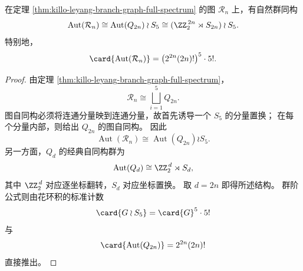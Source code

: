 \begin{proposition}\label{prop:killo-leyang-branch-graph-automorphism-wreath}
在定理 \ref{thm:killo-leyang-branch-graph-full-spectrum} 的图 \(\mathcal R_n\) 上，有自然群同构
\[
\operatorname{Aut}(\mathcal R_n)
\cong
\operatorname{Aut}(Q_{2n})\wr S_5
\cong
(\ZZ_2^{\,2n}\rtimes S_{2n})\wr S_5.
\]
特别地，
\[
\card{\operatorname{Aut}(\mathcal R_n)}
=
\bigl(2^{2n}(2n)!\bigr)^5\cdot 5!.
\]
\end{proposition}
\begin{proof}
由定理 \ref{thm:killo-leyang-branch-graph-full-spectrum}，
\[
\mathcal R_n\cong \bigsqcup_{i=1}^{5}Q_{2n}.
\]
图自同构必须将连通分量映到连通分量，故首先诱导一个 \(S_5\) 的分量置换；
在每个分量内部，则给出 \(Q_{2n}\) 的图自同构。
因此
\[
\operatorname{Aut}(\mathcal R_n)\cong \operatorname{Aut}(Q_{2n})\wr S_5.
\]
另一方面，\(Q_d\) 的经典自同构群为
\[
\operatorname{Aut}(Q_d)\cong \ZZ_2^{\,d}\rtimes S_d,
\]
其中 \(\ZZ_2^{\,d}\) 对应逐坐标翻转，\(S_d\) 对应坐标置换。
取 \(d=2n\) 即得所述结构。
群阶公式则由花环积的标准计数
\[
\card{G\wr S_5}=\card{G}^5\cdot 5!
\]
与
\[
\card{\operatorname{Aut}(Q_{2n})}=2^{2n}(2n)!
\]
直接推出。
\end{proof}

\endinput
